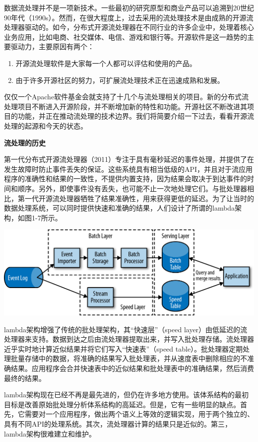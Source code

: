 \documentclass[oneside]{ctexbook}
\begin{document}
数据流处理并不是一项新技术。一些最初的研究原型和商业产品可以追溯到20世纪90年代（1990s）。然而，在很大程度上，过去采用的流处理技术是由成熟的开源流处理器驱动的。如今，分布式开源流处理器在不同行业的许多企业中，处理着核心业务应用，比如电商、社交媒体、电信、游戏和银行等。开源软件是这一趋势的主要驱动力，主要原因有两个：

\begin{enumerate}
  \item 开源流处理软件是大家每一个人都可以评估和使用的产品。 
  \item 由于许多开源社区的努力，可扩展流处理技术正在迅速成熟和发展。
\end{enumerate}

仅仅一个Apache软件基金会就支持了十几个与流处理相关的项目。新的分布式流处理项目不断进入开源阶段，并不断增加新的特性和功能。开源社区不断改进其项目的功能，并正在推动流处理的技术边界。我们将简要介绍一下过去，看看开源流处理的起源和今天的状态。

\textbf{流处理的历史}

第一代分布式开源流处理器（2011）专注于具有毫秒延迟的事件处理，并提供了在发生故障时防止事件丢失的保证。这些系统具有相当低级的API，并且对于流应用程序的准确性和结果的一致性，不提供内置支持，因为结果会取决于到达事件的时间和顺序。另外，即使事件没有丢失，也可能不止一次地处理它们。与批处理器相比，第一代开源流处理器牺牲了结果准确性，用来获得更低的延迟。为了让当时的数据处理系统，可以同时提供快速和准确的结果，人们设计了所谓的lambda架构，如图1-7所示。

\noindent\includegraphics[]{images/spaf_0107.png}

lambda架构增强了传统的批处理架构，其“快速层”（speed layer）由低延迟的流处理器来支持。数据到达之后由流处理器提取出来，并写入批处理存储。流处理器近乎实时地计算近似结果并将它们写入“快速表”（speed table）。批处理器定期处理批量存储中的数据，将准确的结果写入批处理表，并从速度表中删除相应的不准确结果。应用程序会合并快速表中的近似结果和批处理表中的准确结果，然后消费最终的结果。

lambda架构现在已经不再是最先进的，但仍在许多地方使用。该体系结构的最初目标是改善原始批处理分析体系结构的高延迟。但是，它有一些明显的缺点。首先，它需要对一个应用程序，做出两个语义上等效的逻辑实现，用于两个独立的、具有不同API的处理系统。其次，流处理器计算的结果只是近似的。第三，lambda架构很难建立和维护。
\end{document}
